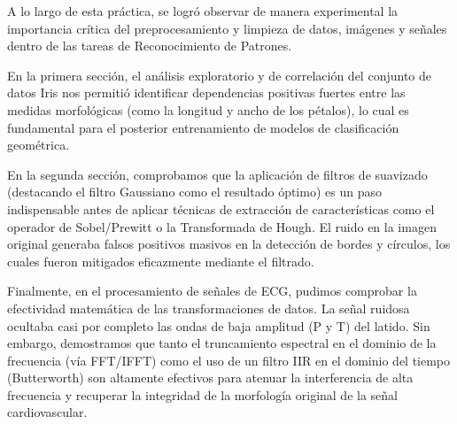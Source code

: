 A lo largo de esta práctica, se logró observar de manera experimental la importancia 
crítica del preprocesamiento y limpieza de datos, imágenes y señales dentro de las 
tareas de Reconocimiento de Patrones. 

En la primera sección, el análisis exploratorio y de correlación del conjunto de datos 
Iris nos permitió identificar dependencias positivas fuertes entre las medidas morfológicas 
(como la longitud y ancho de los pétalos), lo cual es fundamental para el posterior 
entrenamiento de modelos de clasificación geométrica.

En la segunda sección, comprobamos que la aplicación de filtros de suavizado (destacando 
el filtro Gaussiano como el resultado óptimo) es un paso indispensable antes de aplicar 
técnicas de extracción de características como el operador de Sobel/Prewitt o la 
Transformada de Hough. El ruido en la imagen original generaba falsos positivos masivos 
en la detección de bordes y círculos, los cuales fueron mitigados eficazmente mediante 
el filtrado.

Finalmente, en el procesamiento de señales de ECG, pudimos comprobar la efectividad
matemática de las transformaciones de datos. La señal ruidosa ocultaba casi por 
completo las ondas de baja amplitud (P y T) del latido. Sin embargo, demostramos que 
tanto el truncamiento espectral en el dominio de la frecuencia (vía FFT/IFFT) como el 
uso de un filtro IIR en el dominio del tiempo (Butterworth) son altamente efectivos 
para atenuar la interferencia de alta frecuencia y recuperar la integridad de la 
morfología original de la señal cardiovascular.

\QED
